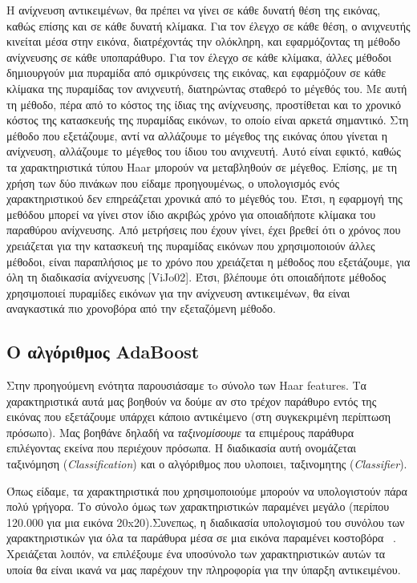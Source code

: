 Η ανίχνευση αντικειμένων, θα πρέπει να γίνει σε κάθε δυνατή θέση της εικόνας, καθώς επίσης
και σε κάθε δυνατή κλίμακα. Για τον έλεγχο σε κάθε θέση, ο ανιχνευτής κινείται μέσα στην εικόνα,
διατρέχοντάς την ολόκληρη, και εφαρμόζοντας τη μέθοδο ανίχνευσης σε κάθε υποπαράθυρο. Για
τον έλεγχο σε κάθε κλίμακα, άλλες μέθοδοι δημιουργούν μια πυραμίδα από σμικρύνσεις της
εικόνας, και εφαρμόζουν σε κάθε κλίμακα της πυραμίδας τον ανιχνευτή, διατηρώντας σταθερό το
μέγεθός του. Με αυτή τη μέθοδο, πέρα από το κόστος της ίδιας της ανίχνευσης, προστίθεται και
το χρονικό κόστος της κατασκευής της πυραμίδας εικόνων, το οποίο είναι αρκετά σημαντικό. Στη
μέθοδο που εξετάζουμε, αντί να αλλάζουμε το μέγεθος της εικόνας όπου γίνεται η ανίχνευση,
αλλάζουμε το μέγεθος του ίδιου του ανιχνευτή. Αυτό είναι εφικτό, καθώς τα χαρακτηριστικά τύπου
Haar μπορούν να μεταβληθούν σε μέγεθος. Επίσης, με τη χρήση των δύο πινάκων που είδαμε
προηγουμένως, ο υπολογισμός ενός χαρακτηριστικού δεν επηρεάζεται χρονικά από το μέγεθός
του. Έτσι, η εφαρμογή της μεθόδου μπορεί να γίνει στον ίδιο ακριβώς χρόνο για οποιαδήποτε
κλίμακα του παραθύρου ανίχνευσης. Από μετρήσεις που έχουν γίνει, έχει βρεθεί ότι ο χρόνος που
χρειάζεται για την κατασκευή της πυραμίδας εικόνων που χρησιμοποιούν άλλες μέθοδοι, είναι
παραπλήσιος με το χρόνο που χρειάζεται η μέθοδος που εξετάζουμε, για όλη τη διαδικασία
ανίχνευσης [ViJo02]. Έτσι, βλέπουμε ότι οποιαδήποτε μέθοδος χρησιμοποιεί πυραμίδες εικόνων
για την ανίχνευση αντικειμένων, θα είναι αναγκαστικά πιο χρονοβόρα από την εξεταζόμενη
μέθοδο.

\subsection{Ο αλγόριθμος AdaBoost}

Στην προηγούμενη ενότητα παρουσιάσαμε τo σύνολο των Haar features. Tα χαρακτηριστικά
αυτά μας βοηθούν να δούμε αν στο τρέχον παράθυρο
εντός της εικόνας που εξετάζουμε υπάρχει κάποιο αντικέιμενο (στη συγκεκριμένη
περίπτωση πρόσωπο). Μας βοηθάνε δηλαδή να \emph{ταξινομίσουμε} τα επιμέρους παράθυρα
επιλέγοντας εκείνα που περιέχουν πρόσωπα. Η διαδικασία αυτή ονομάζεται ταξινόμηση
(\emph{Classification}) και ο αλγόριθμος που υλοποιει, ταξινομητης (\emph{Classifier}).

Όπως είδαμε, τα χαρακτηριστικά που χρησιμοποιούμε μπορούν να υπολογιστούν πάρα πολύ
γρήγορα. Το σύνολο όμως των χαρακτηριστικών παραμένει μεγάλο (περίπου 120.000 για μια
εικόνα 20x20).Συνεπως, η διαδικασία υπολογισμού του συνόλου των χαρακτηριστικών
για όλα τα παράθυρα μέσα σε μια εικόνα παραμένει κοστοβόρα ~\cite{Viola01rapidobject}.
Χρειάζεται λοιπόν, να επιλέξουμε ένα υποσύνολο των χαρακτηριστικών αυτών τα υποία θα
είναι ικανά να μας παρέχουν την πληροφορία για την ύπαρξη αντικειμένου.

